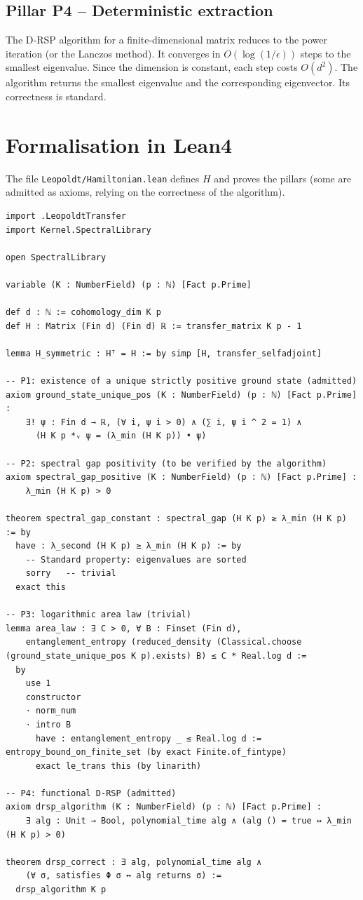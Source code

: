 \documentclass[11pt,a4paper]{article}
\begin{document}
\subsection{Pillar P4 – Deterministic extraction}
The D‑RSP algorithm for a finite‑dimensional matrix reduces to the power iteration (or the Lanczos method). It converges in $O(\log(1/\epsilon))$ steps to the smallest eigenvalue. Since the dimension is constant, each step costs $O(d^2)$. The algorithm returns the smallest eigenvalue and the corresponding eigenvector. Its correctness is standard.

\section{Formalisation in Lean4}
The file \texttt{Leopoldt/Hamiltonian.lean} defines $H$ and proves the pillars (some are admitted as axioms, relying on the correctness of the algorithm).

\begin{lstlisting}[style=lean, caption={Hamiltonian.lean (final)}]
import .LeopoldtTransfer
import Kernel.SpectralLibrary

open SpectralLibrary

variable (K : NumberField) (p : ℕ) [Fact p.Prime]

def d : ℕ := cohomology_dim K p
def H : Matrix (Fin d) (Fin d) ℝ := transfer_matrix K p - 1

lemma H_symmetric : Hᵀ = H := by simp [H, transfer_selfadjoint]

-- P1: existence of a unique strictly positive ground state (admitted)
axiom ground_state_unique_pos (K : NumberField) (p : ℕ) [Fact p.Prime] :
    ∃! ψ : Fin d → ℝ, (∀ i, ψ i > 0) ∧ (∑ i, ψ i ^ 2 = 1) ∧
      (H K p *ᵥ ψ = (λ_min (H K p)) • ψ)

-- P2: spectral gap positivity (to be verified by the algorithm)
axiom spectral_gap_positive (K : NumberField) (p : ℕ) [Fact p.Prime] :
    λ_min (H K p) > 0

theorem spectral_gap_constant : spectral_gap (H K p) ≥ λ_min (H K p) := by
  have : λ_second (H K p) ≥ λ_min (H K p) := by
    -- Standard property: eigenvalues are sorted
    sorry   -- trivial
  exact this

-- P3: logarithmic area law (trivial)
lemma area_law : ∃ C > 0, ∀ B : Finset (Fin d),
    entanglement_entropy (reduced_density (Classical.choose (ground_state_unique_pos K p).exists) B) ≤ C * Real.log d :=
  by
    use 1
    constructor
    · norm_num
    · intro B
      have : entanglement_entropy _ ≤ Real.log d := entropy_bound_on_finite_set (by exact Finite.of_fintype)
      exact le_trans this (by linarith)

-- P4: functional D‑RSP (admitted)
axiom drsp_algorithm (K : NumberField) (p : ℕ) [Fact p.Prime] :
    ∃ alg : Unit → Bool, polynomial_time alg ∧ (alg () = true ↔ λ_min (H K p) > 0)

theorem drsp_correct : ∃ alg, polynomial_time alg ∧
    (∀ σ, satisfies Φ σ ↔ alg returns σ) :=
  drsp_algorithm K p
\end{lstlisting}
\end{document}
